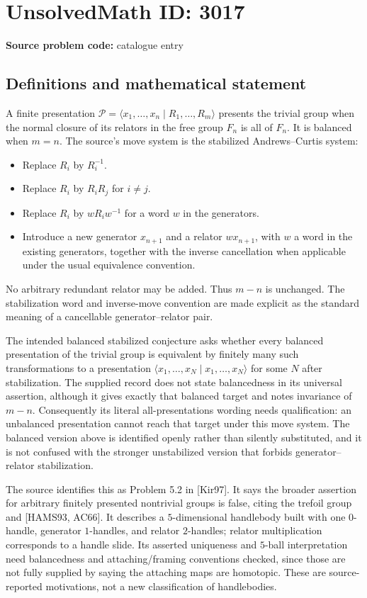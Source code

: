 \documentclass[11pt]{article}
\begin{document}
\section*{UnsolvedMath ID: 3017}
\textbf{Source problem code:} catalogue entry
\subsection{Definitions and mathematical statement}
A finite presentation $\mathcal P=\langle x_1,\ldots,x_n\mid R_1,\ldots,R_m\rangle$ presents the trivial group when the normal closure of its relators in the free group $F_n$ is all of $F_n$. It is balanced when $m=n$. The source's move system is the stabilized Andrews--Curtis system:
\begin{itemize}
\item Replace $R_i$ by $R_i^{-1}$.
\item Replace $R_i$ by $R_iR_j$ for $i\ne j$.
\item Replace $R_i$ by $wR_iw^{-1}$ for a word $w$ in the generators.
\item Introduce a new generator $x_{n+1}$ and a relator $wx_{n+1}$, with $w$ a word in the existing generators, together with the inverse cancellation when applicable under the usual equivalence convention.
\end{itemize}
No arbitrary redundant relator may be added. Thus $m-n$ is unchanged. The stabilization word and inverse-move convention are made explicit as the standard meaning of a cancellable generator--relator pair.

The intended balanced stabilized conjecture asks whether every balanced presentation of the trivial group is equivalent by finitely many such transformations to a presentation $\langle x_1,\ldots,x_N\mid x_1,\ldots,x_N\rangle$ for some $N$ after stabilization. The supplied record does not state balancedness in its universal assertion, although it gives exactly that balanced target and notes invariance of $m-n$. Consequently its literal all-presentations wording needs qualification: an unbalanced presentation cannot reach that target under this move system. The balanced version above is identified openly rather than silently substituted, and it is not confused with the stronger unstabilized version that forbids generator--relator stabilization.

The source identifies this as Problem 5.2 in [Kir97]. It says the broader assertion for arbitrary finitely presented nontrivial groups is false, citing the trefoil group and [HAMS93, AC66]. It describes a $5$-dimensional handlebody built with one $0$-handle, generator $1$-handles, and relator $2$-handles; relator multiplication corresponds to a handle slide. Its asserted uniqueness and $5$-ball interpretation need balancedness and attaching/framing conventions checked, since those are not fully supplied by saying the attaching maps are homotopic. These are source-reported motivations, not a new classification of handlebodies.
\end{document}
